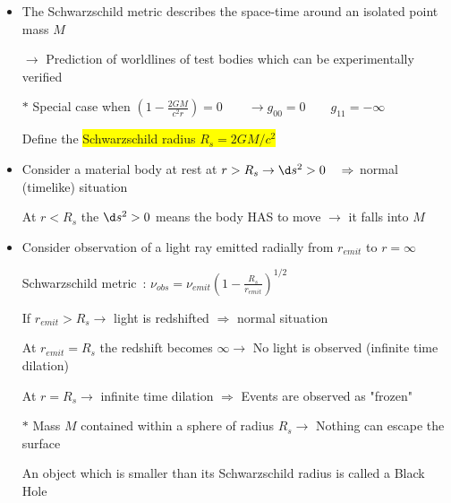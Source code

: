 \Tr
\begin{itemize}
\item {\blue The Schwarzschild metric describes the space-time around an isolated point mass $M$}
\item[] $\rightarrow$ Prediction of worldlines of test bodies which can be experimentally verified
\item[$\ast$] Special case when $\displaystyle \left(1-\frac{2GM}{c^{2}r}\right)=0 \qquad
              \rightarrow g_{00}=0 \qquad g_{11}=-\infty$
\item[] Define the \colorbox{yellow}{\blue Schwarzschild radius $R_{s}=2GM/c^{2}$}
\item Consider a material body at rest at $r>R_{s} \rightarrow \d s^{2}>0 \quad \Rightarrow$
      normal (timelike) situation
\item[] {\red At $r<R_{s}$ the $\d s^{2}>0$ means the body HAS to move $\rightarrow$ it falls into $M$}
\item Consider observation of a light ray emitted radially from $r_{emit}$ to $r=\infty$
\item[] Schwarzschild metric~: $\displaystyle \nu_{obs}=\nu_{emit}\left(1-\frac{R_{s}}{r_{emit}}\right)^{1/2}$
\item[] If $r_{emit}>R_{s} \rightarrow$ light is redshifted $\Rightarrow$ normal situation
\item[] {\red At $r_{emit}=R_{s}$ the redshift becomes $\infty \rightarrow$ No light is observed}
        (infinite time dilation)
\item[] {\blue At $r=R_{s} \rightarrow$ infinite time dilation $\Rightarrow$ Events are observed as "frozen"}
\item[$\ast$] Mass $M$ contained within a sphere of radius $R_{s} \rightarrow$ Nothing can escape the surface
\item[] An object which is smaller than its Schwarzschild radius is called a {\blue Black Hole}
\end{itemize}

